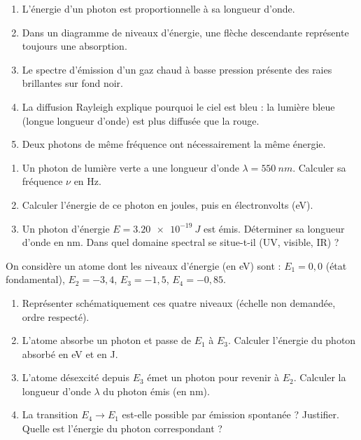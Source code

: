 \documentclass[11pt]{article}
\begin{document}
\begin{exercice}
\begin{enumerate}
    \item L'énergie d'un photon est proportionnelle à sa longueur d'onde.
    \item Dans un diagramme de niveaux d'énergie, une flèche descendante représente toujours une absorption.
    \item Le spectre d'émission d'un gaz chaud à basse pression présente des raies brillantes sur fond noir.
    \item La diffusion Rayleigh explique pourquoi le ciel est bleu : la lumière bleue (longue longueur d'onde) est plus diffusée que la rouge.
    \item Deux photons de même fréquence ont nécessairement la même énergie.
\end{enumerate}
\end{exercice}

\begin{exercice}[Calculs directs : relations $E = h\nu$ et $\lambda = c/\nu$]
\begin{enumerate}
    \item Un photon de lumière verte a une longueur d'onde $\lambda = \SI{550}{nm}$. Calculer sa fréquence $\nu$ en Hz.
    \item Calculer l'énergie de ce photon en joules, puis en électronvolts (eV).
    \item Un photon d'énergie $E = \SI{3,20e-19}{J}$ est émis. Déterminer sa longueur d'onde en nm. Dans quel domaine spectral se situe-t-il (UV, visible, IR) ?
\end{enumerate}
\end{exercice}

\begin{exercice}
On considère un atome dont les niveaux d'énergie (en eV) sont : $E_1 = 0,0$ (état fondamental), $E_2 = -3,4$, $E_3 = -1,5$, $E_4 = -0,85$.
\begin{enumerate}
    \item Représenter schématiquement ces quatre niveaux (échelle non demandée, ordre respecté).
    \item L'atome absorbe un photon et passe de $E_1$ à $E_3$. Calculer l'énergie du photon absorbé en eV et en J.
    \item L'atome désexcité depuis $E_3$ émet un photon pour revenir à $E_2$. Calculer la longueur d'onde $\lambda$ du photon émis (en nm).
    \item La transition $E_4 \to E_1$ est-elle possible par émission spontanée ? Justifier. Quelle est l'énergie du photon correspondant ?
\end{enumerate}
\end{exercice}
\end{document}
